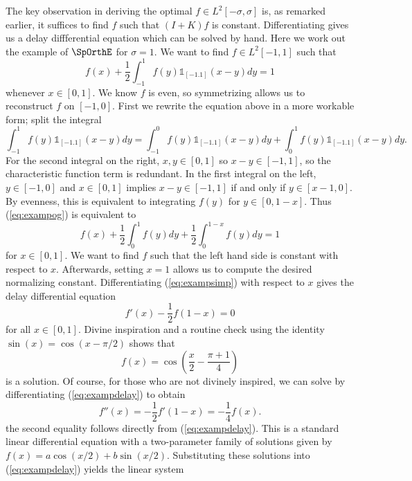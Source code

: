 The key observation in deriving the optimal $f \in L^2 [-\sigma, \sigma]$ is, as remarked earlier, it suffices to find $f$ such that $(I + K) f$ is constant. Differentiating gives us a delay diffferential equation which can be solved by hand. Here we work out the example of $\SpOrthE$ for $\sigma = 1$. We want to find $f \in L^2 [-1, 1]$ such that 
	\begin{equation}
		 f(x) + \frac12 \int_{-1}^1 f(y) \mathbb 1_{[-1. 1]} (x - y) dy = 1 	\label{eq:exampog}
	\end{equation} 
whenever $x \in [0, 1]$. We know $f$ is even, so symmetrizing allows us to reconstruct $f$ on $[-1, 0]$. First we rewrite the equation above in a more workable form; split the integral
	\[ \int_{-1}^1 f(y) \mathbb 1_{[-1. 1]} (x - y) dy = \int_{-1}^0 f(y) \mathbb 1_{[-1. 1]} (x - y) dy + \int_{0}^1 f(y) \mathbb 1_{[-1. 1]} (x - y) dy. \]
For the second integral on the right, $x, y \in [0, 1]$ so $x - y \in [-1, 1]$, so the characteristic function term is redundant. In the first integral on the left, $y \in [-1, 0]$ and $x \in [0, 1]$ implies $x - y \in [-1, 1]$ if and only if $y \in [x - 1, 0]$. By evenness, this is equivalent to integrating $f(y)$ for $y \in [0, 1 - x]$. Thus (\ref{eq:exampog}) is equivalent to 
	\begin{equation}
		f(x) + \frac12\int_0^1 f(y) dy + \frac12 \int_0^{1 - x} f(y) dy = 1		\label{eq:exampsimp}
	\end{equation}	
for $x \in [0, 1]$. We want to find $f$ such that the left hand side is constant with respect to $x$. Afterwards, setting $x = 1$ allows us to compute the desired normalizing constant. Differentiating (\ref{eq:exampsimp}) with respect to $x$ gives the delay differential equation
	\begin{equation}
		f' (x) - \frac12 f(1 - x) = 0						\label{eq:exampdelay}
	\end{equation}
for all $x \in [0, 1]$. Divine inspiration and a routine check using the identity $\sin (x) = \cos(x - \pi/2)$ shows that 
	\[ f(x) = \cos\left( \frac{x}{2} - \frac{\pi + 1}{4} \right) \]	
is a solution. Of course, for those who are not divinely inspired, we can solve by differentiating (\ref{eq:exampdelay}) to obtain
	\begin{equation}
		f''(x) = - \frac12 f' (1 - x) = - \frac14 f(x). 
	\end{equation}
the second equality follows directly from (\ref{eq:exampdelay}). This is a standard linear differential equation with a two-parameter family of solutions given by $f(x) = a \cos(x/2) + b \sin(x/2)$. Substituting these solutions into (\ref{eq:exampdelay}) yields the linear system
